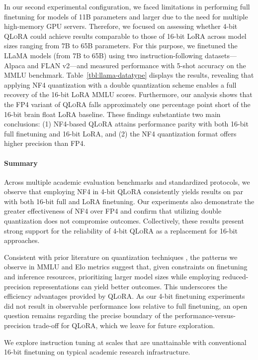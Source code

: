 In our second experimental configuration, we faced limitations in performing full finetuning for models of 11B parameters and larger due to the need for multiple high-memory GPU servers. Therefore, we focused on assessing whether 4-bit \textsc{QLoRA} could achieve results comparable to those of 16-bit LoRA across model sizes ranging from 7B to 65B parameters. For this purpose, we finetuned the LLaMA models (from 7B to 65B) using two instruction-following datasets—Alpaca and FLAN v2—and measured performance with 5-shot accuracy on the MMLU benchmark. Table~\ref{tbl:llama-datatype} displays the results, revealing that applying NF4 quantization with a double quantization scheme enables a full recovery of the 16-bit LoRA MMLU scores. Furthermore, our analysis shows that the FP4 variant of \textsc{QLoRA} falls approximately one percentage point short of the 16-bit brain float LoRA baseline. These findings substantiate two main conclusions: (1) NF4-based \textsc{QLoRA} attains performance parity with both 16-bit full finetuning and 16-bit LoRA, and (2) the NF4 quantization format offers higher precision than FP4.

\paragraph{Summary} Across multiple academic evaluation benchmarks and standardized protocols, we observe that employing NF4 in 4-bit \textsc{QLoRA} consistently yields results on par with both 16-bit full and LoRA finetuning. Our experiments also demonstrate the greater effectiveness of NF4 over FP4 and confirm that utilizing double quantization does not compromise outcomes. Collectively, these results present strong support for the reliability of 4-bit \textsc{QLoRA} as a replacement for 16-bit approaches.

Consistent with prior literature on quantization techniques \citep{dettmers2022case}, the patterns we observe in MMLU and Elo metrics suggest that, given constraints on finetuning and inference resources, prioritizing larger model sizes while employing reduced-precision representations can yield better outcomes. This underscores the efficiency advantages provided by \textsc{QLoRA}. As our 4-bit finetuning experiments did not result in observable performance loss relative to full finetuning, an open question remains regarding the precise boundary of the performance-versus-precision trade-off for \textsc{QLoRA}, which we leave for future exploration.

We explore instruction tuning at scales that are unattainable with conventional 16-bit finetuning on typical academic research infrastructure.

